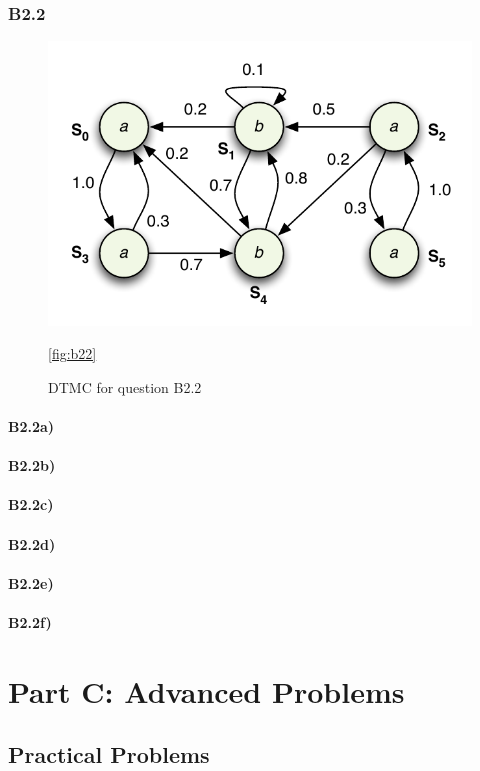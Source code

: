 \documentclass[12pt]{report}
\begin{document}
\subsection*{B2.2}
\begin{figure}[H]
	\begin{center}
		\includegraphics[scale=.85]{../GFX/ExerciseFigure4.pdf}
	\end{center}
	\caption{DTMC for question B2.2}
	\ref{fig:b22}
\end{figure}

\subsubsection*{B2.2a)}
\subsubsection*{B2.2b)}
\subsubsection*{B2.2c)}
\subsubsection*{B2.2d)}
\subsubsection*{B2.2e)}
\subsubsection*{B2.2f)}

\chapter*{Part C: Advanced Problems}
\section*{Practical Problems}
\end{document}
